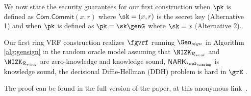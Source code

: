 We now state the security guarantees for our first construction when $ \pk $ is defined as $ \mathsf{Com}.\mathsf{Commit}(x,r) $ where $ \sk = (x, r) $ is the secret key (Alternative 1) and  when $ \pk $ is defined as $ \pk = \sk\genG $ where $ \sk = x $  (Alternative 2).
\begin{theorem}\label{thm:firstprotocol}
	Our first ring VRF construction realizes $ \fgvrf $ running $ \Gen_{sign} $ in Algorithm \ref{alg:gensign} in the random oracle model assuming that $ \NIZK_{\mathcal{R}_{eval}} $ and $ \NIZK_{\mathcal{R}_{ring}}$ are zero-knowledge and knowledge sound, $ \NARK_{\relcomring} $ is knowledge sound, the decisional Diffie-Hellman (DDH) problem is hard in $ \grE  $ . 
\end{theorem}

The proof can be found in the full version of the paper, at this anonymous link~\cite{anonymous}.

